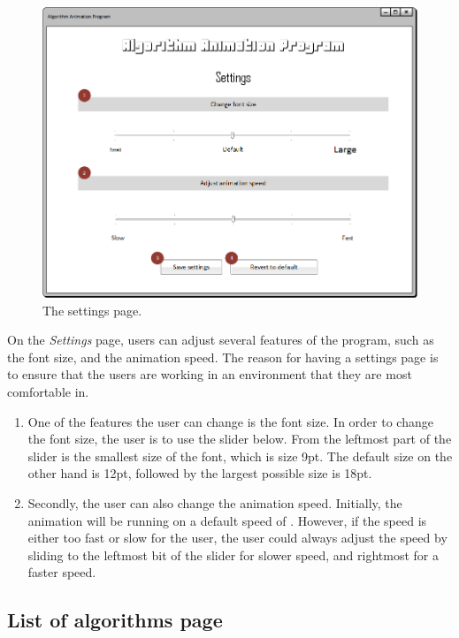 \begin{figure}[H]
\centering
\hspace*{-0.5cm}
\includegraphics[scale=0.8]{images/report_images/uiSettings.png}
\caption{The settings page.}
\label{uiSettings}
\end{figure}

On the \textit{Settings} page, users can adjust several features of the program, such as the font size, and the animation speed. The reason for having a settings page is to ensure that the users are working in an environment that they are most comfortable in.

\begin{enumerate}
\item One of the features the user can change is the font size. In order to change the font size, the user is to use the slider below. From the leftmost part of the slider is the smallest size of the font, which is size 9pt. The default size on the other hand is 12pt, followed by the largest possible size is 18pt. 
\item Secondly, the user can also change the animation speed. Initially, the animation will be running on a default speed of . However, if the speed is either too fast or slow for the user, the user could always adjust the speed by sliding to the leftmost bit of the slider for slower speed, and rightmost for a faster speed.
\end{enumerate}

\subsection{List of algorithms page}

